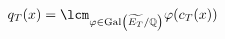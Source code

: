\documentclass[preview]{standalone}
\begin{document}
\begin{center}
$\displaystyle q_T(x) = \lcm_{\varphi \in \text{Gal}\left(\widetilde{E_T}/\mathbb{Q}\right)} \varphi(c_T(x))$
\end{center}
\end{document}
